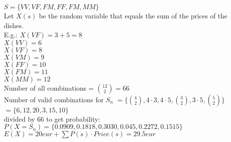 \documentclass[a4paper,11pt]{article}
\begin{document}
$S = \{VV,VF,FM,FF,FM,MM\}$\\

\noindent Let $X(s)$ be the random variable that equals the sum of the prices of the dishes.\\

E.g.: $X(VF) = 3 + 5 = 8$\\

\noindent $X(VV) = 6$ \\
$X(VF) = 8$ \\
$X(VM) = 9$ \\
$X(FF) = 10$ \\
$X(FM) = 11$ \\
$X(MM) = 12$\\

\noindent Number of all combinations = $\binom{12}{2} = 66$\\

\noindent Number of valid combinations for $S_n$  $= \{\binom{4}{2}, 4 \cdot 3, 4 \cdot 5, \binom{3}{2}, 3 \cdot 5, \binom{5}{2}\}$\\

$ = \{6, 12, 20, 3, 15, 10\}$\\

\noindent divided by 66 to get probability: \\

$P(X = S_n) = \{0.0909,0.1818,0.3030,0.045,0.2272,0.1515\}$\\

\noindent $E(X) = 20eur + \sum P(s) \cdot Price(s) = 29.5eur$
\end{document}
